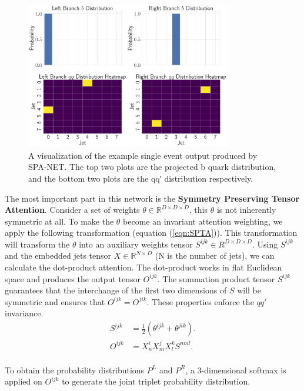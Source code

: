 \begin{figure}[H]
	\centering
	\includegraphics[width=0.8\textwidth]{Figures/typical_output.pdf}
	\caption{A visualization of the example single event output produced by SPA-NET. The top two plots are the projected b quark distribution, and the bottom two plots are the qq′ distribution respectively. }
	\label{fig:output}
\end{figure}
The most important part in this network is the \textbf{Symmetry Preserving Tensor Attention}. Consider a set of weights $\theta \in \mathbb{R}^{D\times D\times D}$, this $\theta$ is not inherently symmetric at all. To make the $\theta$ become an invariant attention weighting, we apply the following transformation (equation (\ref{eqn:SPTA})). This transformation will transform the $\theta$ into an auxiliary weights tensor $S^{ijk}\in R^{D\times D\times D}$. Using $S^{ijk}$ and the embedded jets tensor $X \in \mathbb{R}^{N\times D}$ (N is the number of jets), we can calculate the dot-product attention. The dot-product works in flat Euclidean space and produces the output tensor $O^{ijk}$. The summation product tensor $S^{ijk}$ guarantees that the interchange of the first two dimensions of $S$ will be symmetric and ensures that $O^{ijk}=O^{jik}$. These properties enforce the $qq'$ invariance.
\\
\begin{equation}\label{eqn:SPTA}
	\begin{split}
	S^{ijk} &= \frac{1}{2}\left( \theta^{ijk} + \theta^{jik}\right). \\
	O^{ijk} &= X^{i}_{n}X^{j}_{m}X^{k}_{l}S^{nml}.
		\end{split}
\end{equation}
\\
To obtain the probability distributions $P^{L}$ and $P^{R}$, a 3-dimensional softmax is applied on $O^{ijk}$ to generate the joint triplet probability distribution.
